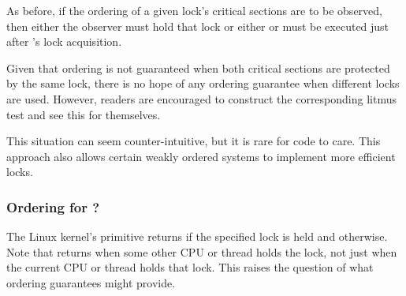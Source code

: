 \QuickQuizEnd

As before, if the ordering of a given lock's critical sections are to
be observed, then either the observer must hold that lock or either
 or  must
be executed just after 's lock acquisition.

Given that ordering is not guaranteed when both critical sections are
protected by the same lock, there is no hope of any ordering guarantee
when different locks are used.
However, readers are encouraged to construct the corresponding litmus
test and see this for themselves.

This situation can seem counter-intuitive, but it is rare for code to
care.
This approach also allows certain weakly ordered systems to implement
more efficient locks.

\subsubsection{Ordering for ?}
\label{sec:memorder:Ordering for spin-is-locked()?}

The Linux kernel's  primitive returns
 if the specified lock is held and  otherwise.
Note that  returns  when some other
CPU or thread holds the lock, not just when the current CPU or thread
holds that lock.
This raises the question of what ordering guarantees 
might provide.

